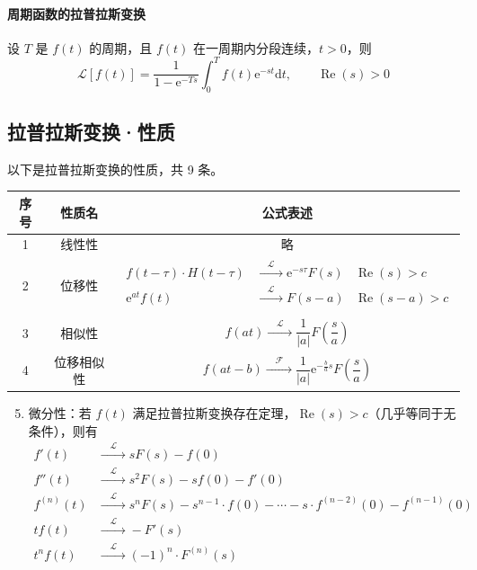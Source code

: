 \documentclass[UTF8]{ctexart}
\renewcommand\arraystretch{1.7}
\newcommand\e{\mathrm{e}}
\renewcommand\d{\mathrm{d}}
\renewcommand\L{\mathcal{L}}
\newcommand\fbh{\xrightarrow{\quad \mathcal{F} \quad}} %
\newcommand\lbh{\xrightarrow{\quad \mathcal{L} \quad}} %
\renewcommand\Re{\operatorname{Re}}
\begin{document}
\paragraph{周期函数的拉普拉斯变换} 设 $T$ 是 $f(t)$ 的周期，且 $f(t)$ 在一周期内分段连续，$t>0$，则
\begin{equation*}
    \L[f(t)] = \dfrac{1}{1-\e^{-Ts}} \int_0^T f(t)\e^{-st}\d t, \qquad \Re(s)>0
\end{equation*}

\subsection{拉普拉斯变换·性质}
以下是拉普拉斯变换的性质，共 9 条。
\begin{mybox}
\begin{center}
\renewcommand\arraystretch{1.2}
    \begin{tabular}{|c|c|c|}
    \hline
    序号 & 性质名 & 公式表述 \\
    \hline
    1 & 线性性 & 略 \\
    \hline
    2 & 位移性 & $\begin{aligned}
        f(t-\tau)\cdot H(t-\tau) & \lbh \e^{-s\tau} F(s) &\Re(s)>c \\
        \e^{at}f(t) &\lbh F(s-a) &\Re(s-a)>c \\
    \end{aligned}$ \\[10pt]
    \hline
    3 & 相似性 & $f(at) \lbh \dfrac{1}{|a|} F\left(\dfrac sa\right)  $\\[8pt]
    \hline
    4 & 位移相似性 & $f(at-b)\fbh \dfrac1{|a|} \e^{-\frac ba s} F\left(\dfrac sa\right)$\\[8pt]
    \hline
    \end{tabular}
\end{center}

\begin{enumerate}[itemsep=0pt]
\setcounter{enumi}{4} %
    \item 微分性：若 $f(t)$ 满足拉普拉斯变换存在定理，$\Re(s)>c$（几乎等同于无条件），则有
    \begin{equation*}\begin{aligned}
        f'(t) &\lbh sF(s) - f(0) \\
        f''(t) &\lbh s^2F(s) - sf(0) - f'(0) \\
        f^{(n)}(t) &\lbh s^nF(s) - s^{n-1}\cdot f(0) -\cdots - s\cdot f^{(n-2)}(0) - f^{(n-1)}(0) \\
        tf(t) &\lbh -F'(s) \\
        t^n f(t) &\lbh (-1)^n\cdot F^{(n)}(s) \\
    \end{aligned}\end{equation*}


\end{enumerate}
\end{mybox}
\end{document}
